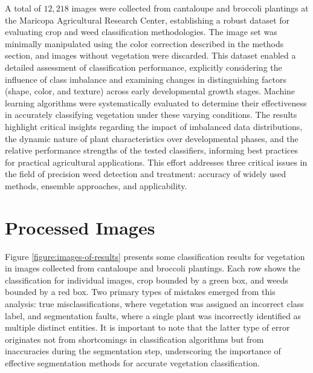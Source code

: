 \documentclass[letterpaper, notitlepage]{report}
\begin{document}
A total of $12,218$ images were collected from cantaloupe and broccoli plantings at the Maricopa Agricultural Research Center, establishing a robust dataset for evaluating crop and weed classification methodologies. The image set was minimally manipulated using the color correction described in the methods section, and images without vegetation were discarded. This dataset enabled a detailed assessment of classification performance, explicitly considering the influence of class imbalance and examining changes in distinguishing factors (shape, color, and texture) across early developmental growth stages. Machine learning algorithms were systematically evaluated to determine their effectiveness in accurately classifying vegetation under these varying conditions. The results highlight critical insights regarding the impact of imbalanced data distributions, the dynamic nature of plant characteristics over developmental phases, and the relative performance strengths of the tested classifiers, informing best practices for practical agricultural applications. This effort addresses three critical issues in the field of precision weed detection and treatment: accuracy of widely used methods, ensemble approaches, and applicability.

\section{Processed Images}
Figure \ref{figure:images-of-results} presents  some classification results for vegetation in images collected from cantaloupe and broccoli plantings. Each row shows the classification for individual images, crop bounded by a green box, and weeds bounded by a red box. Two primary types of mistakes emerged from this analysis: true misclassifications, where vegetation was assigned an incorrect class label, and segmentation faults, where a single plant was incorrectly identified as multiple distinct entities. It is important to note that the latter type of error originates not from shortcomings in classification algorithms but from inaccuracies during the segmentation step, underscoring the importance of effective segmentation methods for accurate vegetation classification.
\end{document}

